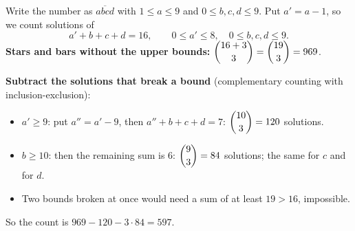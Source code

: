 Write the number as $\overline{abcd}$ with $1\le a\le9$ and $0\le b,c,d\le9$. Put $a'=a-1$, so we count solutions of
\[
a'+b+c+d=16,\qquad 0\le a'\le8,\quad 0\le b,c,d\le9 .
\]
\textbf{Stars and bars without the upper bounds:} $\dbinom{16+3}{3}=\dbinom{19}{3}=969$.

\textbf{Subtract the solutions that break a bound} (complementary counting with inclusion-exclusion):
\begin{itemize}
\item $a'\ge9$: put $a''=a'-9$, then $a''+b+c+d=7$: $\dbinom{10}{3}=120$ solutions.
\item $b\ge10$: then the remaining sum is $6$: $\dbinom93=84$ solutions; the same for $c$ and for $d$.
\item Two bounds broken at once would need a sum of at least $19>16$, impossible.
\end{itemize}
So the count is $969-120-3\cdot84=\boxed{597}$.
